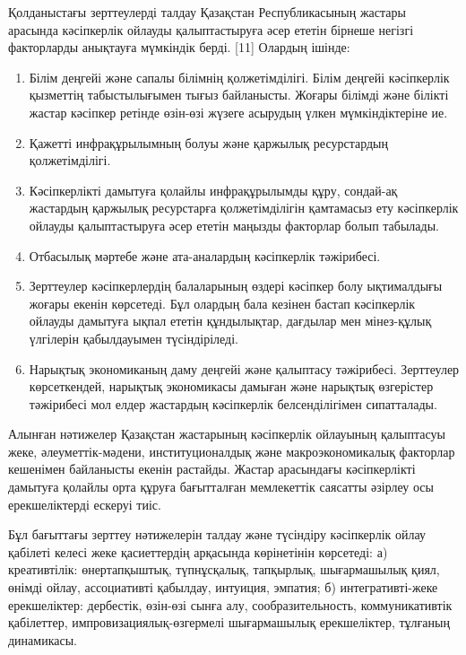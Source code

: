 \begin{multicols}{2}
Қолданыстағы зерттеулерді талдау Қазақстан Республикасының жастары
арасында кәсіпкерлік ойлауды қалыптастыруға әсер ететін бірнеше негізгі
факторларды анықтауға мүмкіндік берді. {[}11{]} Олардың ішінде:

\begin{enumerate}
\def\labelenumi{\arabic{enumi}.}
\item
  Білім деңгейі және сапалы білімнің қолжетімділігі. Білім деңгейі
  кәсіпкерлік қызметтің табыстылығымен тығыз байланысты. Жоғары білімді
  және білікті жастар кәсіпкер ретінде өзін-өзі жүзеге асырудың үлкен
  мүмкіндіктеріне ие.
\item
  Қажетті инфрақұрылымның болуы және қаржылық ресурстардың
  қолжетімділігі.
\item
  Кәсіпкерлікті дамытуға қолайлы инфрақұрылымды құру, сондай-ақ
  жастардың қаржылық ресурстарға қолжетімділігін қамтамасыз ету
  кәсіпкерлік ойлауды қалыптастыруға әсер ететін маңызды факторлар болып
  табылады.
\item
  Отбасылық мәртебе және ата-аналардың кәсіпкерлік тәжірибесі.
\item
  Зерттеулер кәсіпкерлердің балаларының өздері кәсіпкер болу ықтималдығы
  жоғары екенін көрсетеді. Бұл олардың бала кезінен бастап кәсіпкерлік
  ойлауды дамытуға ықпал ететін құндылықтар, дағдылар мен мінез-құлық
  үлгілерін қабылдауымен түсіндіріледі.
\item
  Нарықтық экономиканың даму деңгейі және қалыптасу тәжірибесі.
  Зерттеулер көрсеткендей, нарықтық экономикасы дамыған және нарықтық
  өзгерістер тәжірибесі мол елдер жастардың кәсіпкерлік белсенділігімен
  сипатталады.
\end{enumerate}

Алынған нәтижелер Қазақстан жастарының кәсіпкерлік ойлауының қалыптасуы
жеке, әлеуметтік-мәдени, институционалдық және макроэкономикалық
факторлар кешенімен байланысты екенін растайды. Жастар арасындағы
кәсіпкерлікті дамытуға қолайлы орта құруға бағытталған мемлекеттік
саясатты әзірлеу осы ерекшеліктерді ескеруі тиіс.

Бұл бағыттағы зерттеу нәтижелерін талдау және түсіндіру кәсіпкерлік
ойлау қабілеті келесі жеке қасиеттердің арқасында көрінетінін көрсетеді:
а) креативтілік: өнертапқыштық, түпнұсқалық, тапқырлық, шығармашылық
қиял, өнімді ойлау, ассоциативті қабылдау, интуиция, эмпатия; б)
интегративті-жеке ерекшеліктер: дербестік, өзін-өзі сынға алу,
сообразительность, коммуникативтік қабілеттер, импровизациялық-өзгермелі
шығармашылық ерекшеліктер, тұлғаның динамикасы.


\end{multicols}

